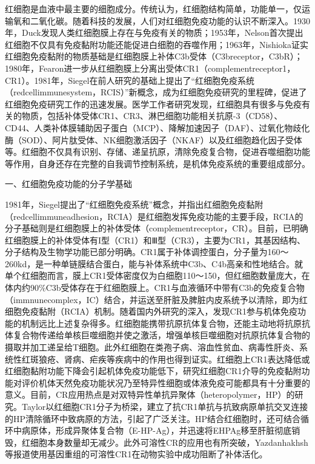 红细胞是血液中最主要的细胞成分。传统认为，红细胞结构简单，功能单一，仅运输氧和二氧化碳。随着科技的发展，人们对红细胞免疫功能的认识不断深入。1930年，Duck发现人类红细胞膜上存在与免疫有关的物质；1953年，Nelson首次提出红细胞不仅具有免疫黏附功能还能促进白细胞的吞噬作用；1963年，Nishioka证实红细胞免疫黏附的物质基础是红细胞膜上补体C3b受体（C3breceptor，C3bR）；1980年，Fearon进一步从红细胞膜上分离出受体CR1（complementreceptor1，CR1）。1981年，Siegel在前人研究的基础上提出了“红细胞免疫系统（redcellimmunesystem，RCIS）”新概念，成为红细胞免疫研究的里程碑，促进了红细胞免疫研究工作的迅速发展。医学工作者研究发现，红细胞具有很多与免疫有关的物质，包括补体受体CR1、CR3、淋巴细胞功能相关抗原-3（CD58）、CD44、人类补体膜辅助因子蛋白（MCP）、降解加速因子（DAF）、过氧化物歧化酶（SOD）、阿片肽受体、NK细胞激活因子（NKAF）以及红细胞趋化因子受体等。红细胞不仅具有识别、存储、递呈抗原，清除免疫复合物，促进吞噬细胞功能等作用，自身还存在完整的自我调节控制系统，是机体免疫系统的重要组成部分。

\begin{center}
{\large 一、红细胞免疫功能的分子学基础}
\end{center}

1981年，Siegel提出了“红细胞免疫系统”概念，并指出红细胞免疫黏附（redcellimmuneadhesion，RCIA）是红细胞发挥免疫功能的主要手段，RCIA的分子基础则是红细胞膜上的补体受体（complementreceptor，CR）。目前，已明确红细胞膜上的补体受体有I型（CR1）和Ⅲ型（CR3），主要为CR1，其基因结构、分子结构及生物学功能已部分明确。CR1属于补体调控蛋白，分子量为160～260kd，是一种单链膜结合蛋白，能与补体系统中C3b、C4b高亲和性地结合。就单个红细胞而言，膜上CR1受体密度仅为白细胞110～150，但红细胞数量庞大，在体内约90\%C3b受体存在于红细胞膜上。CR1与血液循环中带有C3b的免疫复合物（immnunecomplex，IC）结合，并运送至肝脏及脾脏内皮系统予以清除，即为红细胞免疫黏附（RCIA）机制。随着国内外研究的深入，发现CR1参与机体免疫功能的机制远比上述复杂得多。红细胞能携带抗原抗体复合物，还能主动地将抗原抗体复合物传递给单核巨噬细胞并使之激活，增强单核巨噬细胞对抗原抗体复合物的摄取并加工递呈给T细胞。此外红细胞在类孢子病、溶血性贫血、病毒性肝炎、系统性红斑狼疮、肾病、疟疾等疾病中的作用也得到证实。红细胞上CR1表达降低或红细胞黏附功能下降会引起机体免疫功能低下，研究红细胞CR1介导的免疫黏附功能对评价机体天然免疫功能状况乃至特异性细胞或体液免疫可能都具有十分重要的意义。目前，CR应用热点是对双特异性单抗异聚体（heteropolymer，HP）的研究。Taylor以红细胞CR1分子为桥梁，建立了抗CR1单抗与抗致病原单抗交叉连接的HP清除循环中致病原的方法，引起了广泛关注。HP结合红细胞时，还可结合循环中病原体，形成异聚体复合物（E-HP-Ag），并迅速将EHPAg移至肝脏彻底销毁，红细胞本身数量却无减少。此外可溶性CR的应用也有所突破，Yazdanhakhsh等报道使用基因重组的可溶性CR1在动物实验中成功阻断了补体活化。

